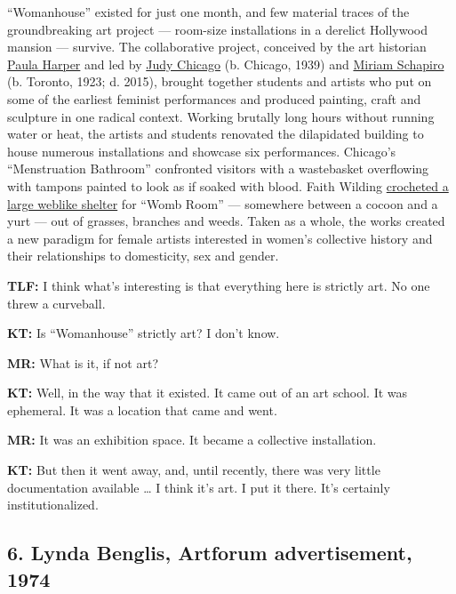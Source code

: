 ``Womanhouse'' existed for just one month, and few material traces of
the groundbreaking art project --- room-size installations in a derelict
Hollywood mansion --- survive. The collaborative project, conceived by
the art historian
\href{https://www.nytimes.com/2012/06/26/arts/design/paula-hays-harper-feminist-art-historian-dies-at-81.html}{Paula
Harper} and led by
\href{https://www.nytimes.com/2018/02/07/t-magazine/judy-chicago-dinner-party.html}{Judy
Chicago} (b. Chicago, 1939) and
\href{https://www.nytimes.com/2015/06/25/arts/design/miriam-schapiro-91-a-feminist-artist-who-harnessed-craft-and-pattern-dies.html}{Miriam
Schapiro} (b. Toronto, 1923; d. 2015), brought together students and
artists who put on some of the earliest feminist performances and
produced painting, craft and sculpture in one radical context. Working
brutally long hours without running water or heat, the artists and
students renovated the dilapidated building to house numerous
installations and showcase six performances. Chicago's ``Menstruation
Bathroom'' confronted visitors with a wastebasket overflowing with
tampons painted to look as if soaked with blood. Faith Wilding
\href{https://www.nytimes.com/2018/03/14/t-magazine/art/fiber-knitting-weaving-politics.html}{crocheted
a large weblike shelter} for ``Womb Room'' --- somewhere between a
cocoon and a yurt --- out of grasses, branches and weeds. Taken as a
whole, the works created a new paradigm for female artists interested in
women's collective history and their relationships to domesticity, sex
and gender.

\textbf{TLF:} I think what's interesting is that everything here is
strictly art. No one threw a curveball.

\textbf{KT:} Is ``Womanhouse'' strictly art? I don't know.

\textbf{MR:} What is it, if not art?

\textbf{KT:} Well, in the way that it existed. It came out of an art
school. It was ephemeral. It was a location that came and went.

\textbf{MR:} It was an exhibition space. It became a collective
installation.

\textbf{KT:} But then it went away, and, until recently, there was very
little documentation available \ldots{} I think it's art. I put it
there. It's certainly institutionalized.

\hypertarget{6-lynda-benglis-artforum-advertisement-1974}{%
\subsection{6. Lynda Benglis, Artforum advertisement,
1974}\label{6-lynda-benglis-artforum-advertisement-1974}}

